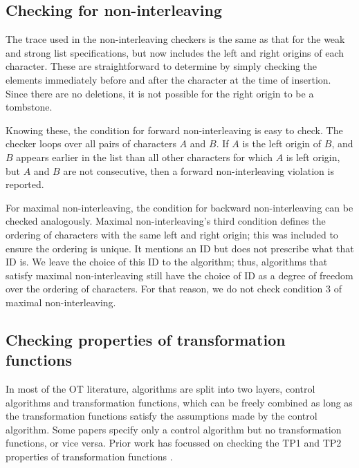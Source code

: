 \documentclass[sigplan,10pt,review,anonymous]{acmart}
\begin{document}
\subsection{Checking for non-interleaving}

The trace used in the non-interleaving checkers is the same as that for the weak and strong list specifications, but now includes the left and right origins of each character. These are straightforward to determine by simply checking the elements immediately before and after the character at the time of insertion. Since there are no deletions, it is not possible for the right origin to be a tombstone.

Knowing these, the condition for forward non-interleaving is easy to check. The checker loops over all pairs of characters $A$ and $B$. If $A$ is the left origin of $B$, and $B$ appears earlier in the list than all other characters for which $A$ is left origin, but $A$ and $B$ are not consecutive, then a forward non-interleaving
violation is reported.

For maximal non-interleaving, the condition for backward non-interleaving can be checked analogously. Maximal non-interleaving's third condition defines the ordering 
of characters with the same left and right origin; this was included to ensure the ordering is unique. It mentions an ID but does not prescribe what that ID is. We leave the choice of this ID to the algorithm; thus, algorithms that satisfy maximal non-interleaving still have the choice of ID as a degree of freedom over the ordering of characters. For that reason, we do not check condition 3
of maximal non-interleaving.  

\subsection{Checking properties of transformation functions}

In most of the OT literature, algorithms are split into two layers, control algorithms and transformation functions, which can be freely combined as long as the transformation functions satisfy the assumptions made by the control algorithm.
Some papers specify only a control algorithm but no transformation functions, or vice versa.
Prior work has focussed on checking the TP1 and TP2 properties of transformation functions \cite{Imine2003,Jungnickel2015}.
\end{document}
